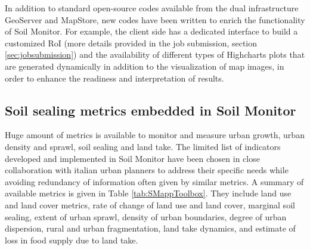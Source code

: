 \documentclass[APA,LATO1COL,doublespace]{WileyNJD-v2}
\newcommand{\update}[1]{\emph{\textcolor{blue}{#1}}}     %
\begin{document}
In addition to standard open-source codes available from the dual infrastructure GeoServer and MapStore, new codes have been written to enrich the functionality of Soil Monitor.
For example, the client side has a dedicated interface to build a customized RoI (more details provided in the job submission, section \ref{sec:jobsubmission}) and the availability of different types of Highcharts plots that are generated dynamically in addition to the visualization of map images, in order to enhance the readiness and interpretation of results.


\subsection{Soil sealing metrics embedded in Soil Monitor } %
\label{sec:metrics}
Huge amount of metrics is available to monitor and measure urban growth, urban density and sprawl, soil sealing and land take.
The limited list of indicators developed and implemented in Soil Monitor have been chosen in close collaboration with italian urban planners to address their specific needs while avoiding redundancy of information often given by similar metrics. 
A summary of available metrics is given in Table \ref{tab:SMappToolbox}.
They include land use and land cover metrics, rate of change of land use and land cover, marginal soil sealing, extent of urban sprawl, density of urban boundaries, degree of urban dispersion, rural and urban fragmentation, land take dynamics, and estimate of loss in food supply due to land take. 
\end{document}
